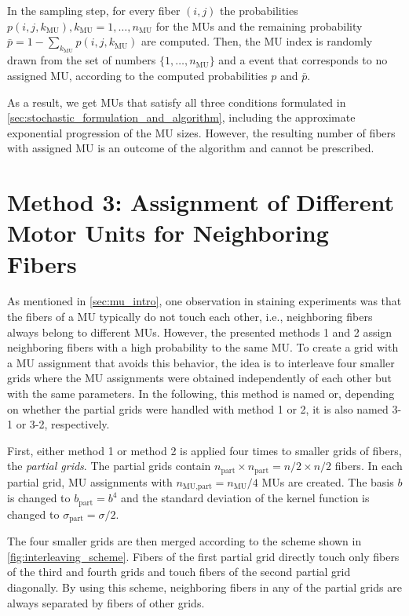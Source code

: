 In the sampling step, for every fiber $(i,j)$ the probabilities $p(i,j,k_\text{MU}), k_\text{MU}=1,\dots,n_\text{MU}$ for the MUs and the remaining probability $\bar{p} = 1-\sum_{k_\text{MU}} p(i,j,k_\text{MU})$ are computed. Then, the MU index is randomly drawn from the set of numbers $\{1,\dots,n_\text{MU}\}$ and a  event that corresponds to no assigned MU, according to the computed probabilities $p$ and $\bar{p}$. 

As a result, we get MUs that satisfy all three conditions formulated in \cref{sec:stochastic_formulation_and_algorithm}, including the approximate exponential progression of the MU sizes. However, the resulting number of fibers with assigned MU is an outcome of the algorithm and cannot be prescribed.

\section{Method 3: Assignment of Different Motor Units for Neighboring Fibers}\label{sec:method3_modification}

As mentioned in \cref{sec:mu_intro}, one observation in staining experiments was that the fibers of a MU typically do not touch each other, i.e., neighboring fibers always belong to different MUs.
However, the presented methods 1 and 2 assign neighboring fibers with a high probability to the same MU. To create a grid with a MU assignment that avoids this behavior, the idea is to interleave four smaller grids where the MU assignments were obtained independently of each other but with the same parameters. In the following, this method is named  or, depending on whether the partial grids were handled with method 1 or 2, it is also named 3-1 or 3-2, respectively.

First, either method 1 or method 2 is applied four times to smaller grids of fibers, the \emph{partial grids}. The partial grids contain $n_\text{part} \times n_\text{part} = n/2 \times n/2$ fibers. In each partial grid, MU assignments with $n_\text{MU,part} = n_\text{MU}/4$ MUs are created. The basis $b$ is changed to $b_\text{part} = b^4$ and the standard deviation of the kernel function is changed to $\sigma_\text{part} = \sigma/2$. 

The four smaller grids are then merged according to the scheme shown in \cref{fig:interleaving_scheme}. Fibers of the first partial grid directly touch only fibers of the third and fourth grids and touch fibers of the second partial grid diagonally. By using this scheme, neighboring fibers in any of the partial grids are always separated by fibers of other grids. 

